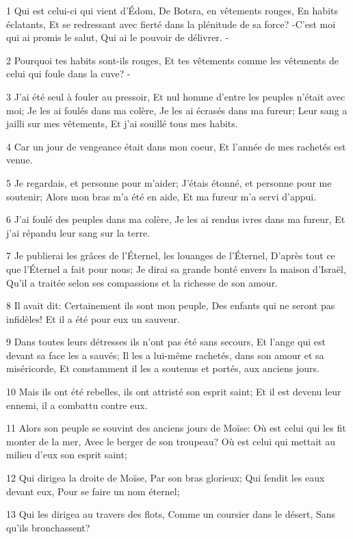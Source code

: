 \par 1 Qui est celui-ci qui vient d'Édom, De Botsra, en vêtements rouges, En habits éclatants, Et se redressant avec fierté dans la plénitude de sa force? -C'est moi qui ai promis le salut, Qui ai le pouvoir de délivrer. -
\par 2 Pourquoi tes habits sont-ils rouges, Et tes vêtements comme les vêtements de celui qui foule dans la cuve? -
\par 3 J'ai été seul à fouler au pressoir, Et nul homme d'entre les peuples n'était avec moi; Je les ai foulés dans ma colère, Je les ai écrasés dans ma fureur; Leur sang a jailli sur mes vêtements, Et j'ai souillé tous mes habits.
\par 4 Car un jour de vengeance était dans mon coeur, Et l'année de mes rachetés est venue.
\par 5 Je regardais, et personne pour m'aider; J'étais étonné, et personne pour me soutenir; Alors mon bras m'a été en aide, Et ma fureur m'a servi d'appui.
\par 6 J'ai foulé des peuples dans ma colère, Je les ai rendus ivres dans ma fureur, Et j'ai répandu leur sang sur la terre.
\par 7 Je publierai les grâces de l'Éternel, les louanges de l'Éternel, D'après tout ce que l'Éternel a fait pour nous; Je dirai sa grande bonté envers la maison d'Israël, Qu'il a traitée selon ses compassions et la richesse de son amour.
\par 8 Il avait dit: Certainement ils sont mon peuple, Des enfants qui ne seront pas infidèles! Et il a été pour eux un sauveur.
\par 9 Dans toutes leurs détresses ils n'ont pas été sans secours, Et l'ange qui est devant sa face les a sauvés; Il les a lui-même rachetés, dans son amour et sa miséricorde, Et constamment il les a soutenus et portés, aux anciens jours.
\par 10 Mais ils ont été rebelles, ils ont attristé son esprit saint; Et il est devenu leur ennemi, il a combattu contre eux.
\par 11 Alors son peuple se souvint des anciens jours de Moïse: Où est celui qui les fit monter de la mer, Avec le berger de son troupeau? Où est celui qui mettait au milieu d'eux son esprit saint;
\par 12 Qui dirigea la droite de Moïse, Par son bras glorieux; Qui fendit les eaux devant eux, Pour se faire un nom éternel;
\par 13 Qui les dirigea au travers des flots, Comme un coursier dans le désert, Sans qu'ils bronchassent?
